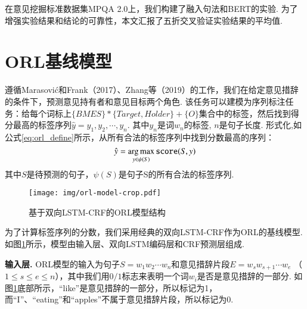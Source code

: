 在意见挖掘标准数据集MPQA 2.0上，我们构建了融入句法和BERT的实验. 为了增强实验结果和结论的可靠性，本文汇报了五折交叉验证实验结果的平均值.
%


\section{ORL基线模型}
遵循Marasovi{\'c}和Frank（2017）、Zhang等（2019）的工作，我们在给定意见措辞的条件下，预测意见持有者和意见目标两个角色. 该任务可以建模为序列标注任务：给每个词标上$\{BMES\}*\{Target, Holder\} + \{O\}$集合中的标签，然后找到得分最高的标签序列$\hat{y} = y_1,y_2,\cdots, y_n$.
其中$y_n$是词$w_n$的标签, $n$是句子长度. 形式化,如公式\ref{eq:orl_define}所示，从所有合法的标签序列中找到分数最高的序列：
\begin{equation}
    \setlength{\abovedisplayskip}{9pt}
    \setlength{\belowdisplayskip}{9pt}
    \label{eq:orl_define}
    \hat{y} = \mathop{\arg\max}_{y \in \psi(S)} \texttt{score}(S, y)
\end{equation}
其中$S$是待预测的句子，$\psi(S)$是句子S的所有合法的标签序列.

\begin{figure}[hb]
    \centering
    \texttt{[image: img/orl-model-crop.pdf]}
    \caption{基于双向LSTM-CRF的ORL模型结构}
    \label{fig:orl_model}
\end{figure}

为了计算标签序列的分数，我们采用经典的双向LSTM-CRF作为ORL的基线模型.
如图\ref{fig:orl_model}所示，模型由输入层、双向LSTM编码层和CRF预测层组成.

\textbf{输入层.  } ORL模型的输入为句子$S=w_1w_2\cdots w_n$和意见措辞片段$E=w_sw_{s+1}\cdots w_e$ （$1 \leq s\leq e \leq n$），其中我们用$0/1$标志来表明一个词$w_i$是否是意见措辞的一部分. 如图\ref{fig:orl_model}底部所示，“like”是意见措辞的一部分，所以标记为1，而“I”、“eating”和“apples”不属于意见措辞片段，所以标记为0.

